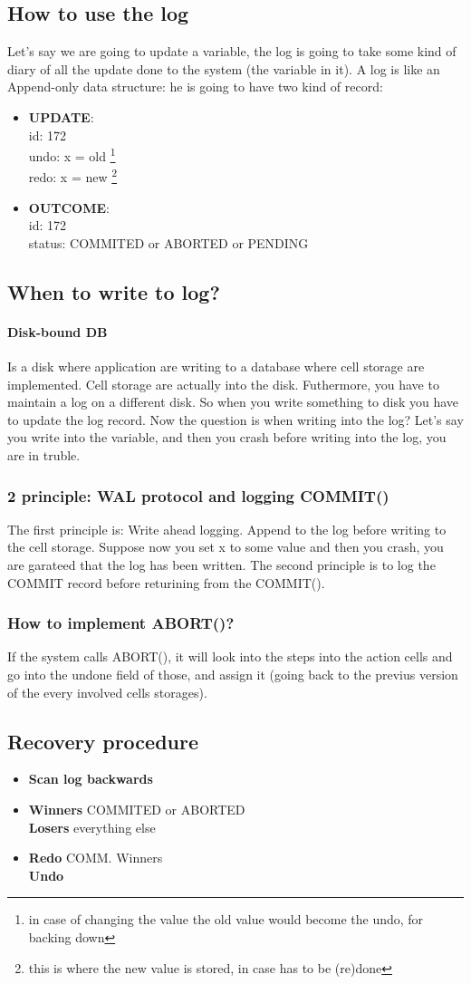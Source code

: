 \documentclass{article}
\begin{document}
  \subsection{How to use the log}
    Let's say we are going to update a variable, the log is going to take some kind of 
    diary of all the update done to the system (the variable in it). A log is like an
    Append-only data structure: he is going to have two kind of record: 
    \begin{itemize}
      \item \textbf{UPDATE}: \\ id: 172 \\ undo: x = old \footnote{in case of changing the value
        the old value would become the undo, for backing down} \\ redo: x = new \footnote{this is
        where the new value is stored, in case has to be (re)done}
      \item \textbf{OUTCOME}: \\ id: 172 \\ status: COMMITED or ABORTED or PENDING
    \end{itemize}
  \subsection{When to write to log?}
    \paragraph{Disk-bound DB} Is a disk where application are writing to a database where cell
      storage are implemented. Cell storage are actually into the disk. Futhermore, you have
      to maintain a log on a different disk. So when you write something to disk you have to
      update the log record. Now the question is when writing into the log? Let's say you
      write into the variable, and then you crash before writing into the log, you are in
      truble. 
    \subsubsection{2 principle: WAL protocol and logging COMMIT()}
      The first principle is: Write ahead logging. Append to the log before writing to the 
      cell storage. Suppose now you set x to some value and then you crash, you are garateed
      that the log has been written. The second principle is to log the COMMIT record 
      before returining from the COMMIT().
    \subsubsection{How to implement ABORT()?}
      If the system calls ABORT(), it will look into the steps into the action cells and 
      go into the undone field of those, and assign it (going back to the previus version of the
      every involved cells storages).
  \subsection{Recovery procedure}
    \begin{itemize}
      \item\textbf{Scan log backwards}
      \item\textbf{Winners} COMMITED or ABORTED \\ \textbf{Losers} everything else
      \item\textbf{Redo} COMM. Winners \\ \textbf{Undo}
    \end{itemize}
\end{document}
